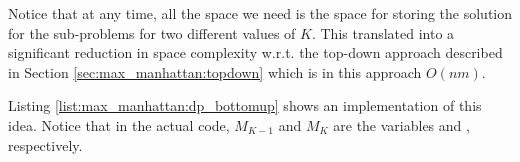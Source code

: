 Notice that at any time, all the space we need is the space for storing the solution for the
sub-problems for two different values of $K$. This translated into a significant reduction in  space
complexity w.r.t. the top-down approach described in Section \ref{sec:max_manhattan:topdown} which
is in this approach $O(nm)$.

Listing \ref{list:max_manhattan:dp_bottomup} shows an implementation of this idea. Notice that in
the actual code, $M_{K-1}$ and $M_{K}$ are the variables  and ,
respectively. 


